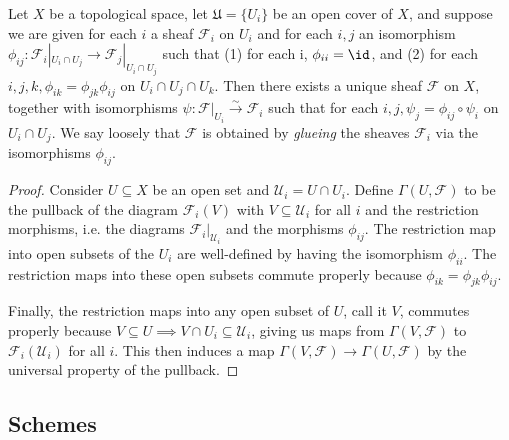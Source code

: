 \begin{exercise}%
	Let $X$ be a topological space, let $\mathfrak{U} = \{U_i\}$  be an open cover of $X$, and suppose we are given for each $i$ a sheaf $\mathscr{F}_i$ on $U_i$ and for each $i,j$ an isomorphism $\phi_{ij}:\mathscr{F}_i|_{U_i\cap U_j} \to \mathscr{F}_j|_{U_i\cap U_j}$ such that (1) for each i, $\phi_{ii} = \id$, and (2) for each $i,j,k, \phi_{ik} = \phi_{jk} \phi_{ij}$ on $U_i\cap U_j\cap U_k $. Then there exists a unique sheaf $\mathscr{F}$ on $X$, together with isomorphisms $\psi:\mathscr{F}|_{U_i} \xrightarrow{\sim} \mathscr{F}_i$ such that for each $i,j, \psi_j = \phi_{ij} \circ \psi_i$ on $U_i \cap U_j$. We say loosely that $\mathscr{F}$ is obtained by \textit{glueing} the sheaves $\mathscr{F}_i$ via the isomorphisms $\phi_{ij}$.
\end{exercise}
\begin{proof}
	Consider $U \subseteq X $ be an open set and $\mathscr{U}_i = U \cap U_i $.
	Define $\Gamma(U, \mathscr{F}) $ to be the pullback of the diagram $\mathscr{F}_i(V) $ with $V \subseteq \mathscr{U}_i $ for all $i $ and the restriction morphisms, i.e. the diagrams $\mathscr{F}_i|_{\mathscr{U}_i} $ and the morphisms $\phi_{ij}$.
	The restriction map into open subsets of the $U_i $ are well-defined by having the isomorphism $\phi_{ii}$.
	The restriction maps into these open subsets commute properly because $\phi _{ik} = \phi _{jk}\phi _{ij} $.

	Finally, the restriction maps into any open subset of $U $, call it $V $, commutes properly because $V\subseteq U \implies V\cap U_i \subseteq \mathscr{U}_i $, giving us maps from $\Gamma(V, \mathscr{F}) $ to $\mathscr{F}_i(\mathscr{U}_i) $ for all $i $.
	This then induces a map $\Gamma(V, \mathscr{F}) \to \Gamma(U,\mathscr{F}) $ by the universal property of the pullback.
\end{proof}

\subsection{Schemes}

